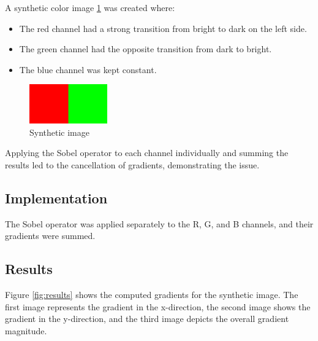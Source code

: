 
A synthetic color image \ref{fig:synthetic} was created where:
\begin{itemize}
    \item The red channel had a strong transition from bright to dark on the left side.
    \item The green channel had the opposite transition from dark to bright.
    \item The blue channel was kept constant.
\end{itemize}

\begin{figure}[h]
    \centering
    \includegraphics[width=0.3\textwidth]{../Images/synthetic_image.png}
    \caption{Synthetic image}
    \label{fig:synthetic}
\end{figure}

Applying the Sobel operator to each channel individually and summing the results led to the cancellation of gradients, demonstrating the issue.

\subsection*{Implementation}
The Sobel operator was applied separately to the R, G, and B channels, and their gradients were summed.



\subsection*{Results}
Figure \ref{fig:results} shows the computed gradients for the synthetic image. The first image represents the gradient in the x-direction, the second image shows the gradient in the y-direction, and the third image depicts the overall gradient magnitude.

